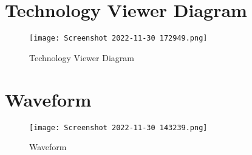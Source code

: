 \documentclass[10pt]{article}
\begin{document}
\section{\textbf{Technology Viewer Diagram}}

\begin{figure}[H]
    \centering
    \texttt{[image: Screenshot 2022-11-30 172949.png]}
    \caption{Technology Viewer Diagram}
    \label{fig:my_label8}
\end{figure}

\section{Waveform}

\begin{figure}[H]
    \centering
    \texttt{[image: Screenshot 2022-11-30 143239.png]}
	\caption{Waveform}
    \label{fig:my_label5}
\end{figure}
\end{document}
